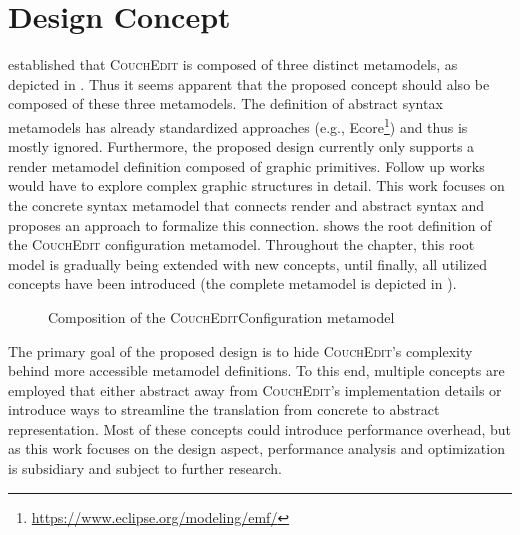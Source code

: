 \chapter{Design Concept}
\label{ch:design}
 established that \textsc{CouchEdit} is composed of three distinct metamodels,  as depicted in . Thus it seems apparent that the proposed concept should also be composed of these three metamodels. The definition of abstract syntax metamodels has already standardized approaches (e.g., Ecore\footnote{\url{https://www.eclipse.org/modeling/emf/}}) and thus is mostly ignored. Furthermore, the proposed design currently only supports a render metamodel definition composed of graphic primitives. Follow up works would have to explore complex graphic structures in detail.  This work focuses on the concrete syntax metamodel that connects render and abstract syntax and proposes an approach to formalize this connection.  shows the root definition of the \textsc{CouchEdit} configuration metamodel. Throughout the chapter, this root model is gradually being extended with new concepts, until finally, all utilized concepts have been introduced (the complete metamodel is depicted in ).

\begin{figure}[ht]
  \centering
  
  \caption{Composition of the \textsc{CouchEdit}Configuration metamodel}
  \label{fig:metamodel-base}
\end{figure}

The primary goal of the proposed design is to hide \textsc{CouchEdit}'s complexity behind more accessible metamodel definitions. To this end, multiple concepts are employed that either abstract away from \textsc{CouchEdit}'s implementation details or introduce ways to streamline the translation from concrete to abstract representation. Most of these concepts could introduce performance overhead, but as this work focuses on the design aspect, performance analysis and optimization is subsidiary and subject to further research.

